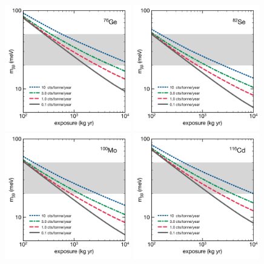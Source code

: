 \documentclass{PoS}
\begin{document}
\begin{figure}
\centering
\includegraphics[width=0.49\textwidth]{img/FutureGe76.pdf}
\includegraphics[width=0.49\textwidth]{img/FutureSe82.pdf}
\includegraphics[width=0.49\textwidth]{img/FutureMo100.pdf}
\includegraphics[width=0.49\textwidth]{img/FutureCd116.pdf}

\end{figure}
\end{document}
